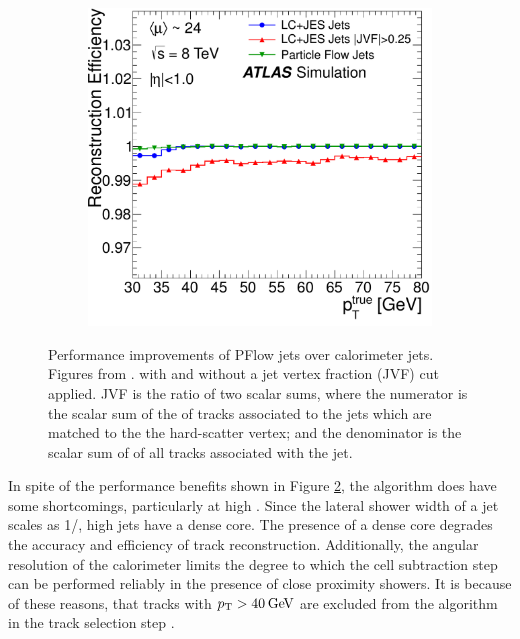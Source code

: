 \begin{figure}[t]
\begin{subfigure}[b]{0.46\textwidth}
    \includegraphics[width=\textwidth]{plots/atlas/pflow_performance_b.pdf}
    \caption{}
    \label{fig:pflow_perf:b}
\end{subfigure}
\caption{Performance improvements of PFlow jets over calorimeter jets. Figures from \cite{Atlas:PFlow}. with and without a jet vertex fraction (JVF) cut applied. JVF is the ratio of two scalar sums, where the numerator is the scalar sum of the \pt of tracks associated to the jets which are matched to the the hard-scatter vertex; and the denominator is the scalar sum of \pt of all tracks associated with the jet. \label{fig:pflow_perf}}
\end{figure}

In spite of the performance benefits shown in Figure \ref{fig:pflow_perf}, the algorithm does have some shortcomings, particularly at high \pt. Since the lateral shower width of a jet scales as 1/\pt, high \pt jets have a dense core. The presence of a dense core degrades the accuracy and efficiency of track reconstruction. Additionally, the angular resolution of the calorimeter limits the degree to which the cell subtraction step can be performed reliably in the presence of close proximity showers. It is because of these reasons, that tracks with $p_{\text{T}} > 40\hspace{2pt}\text{Ge\kern -0.1em V}$ are excluded from the algorithm in the track selection step \cite{Atlas:PFlowOG}. 

